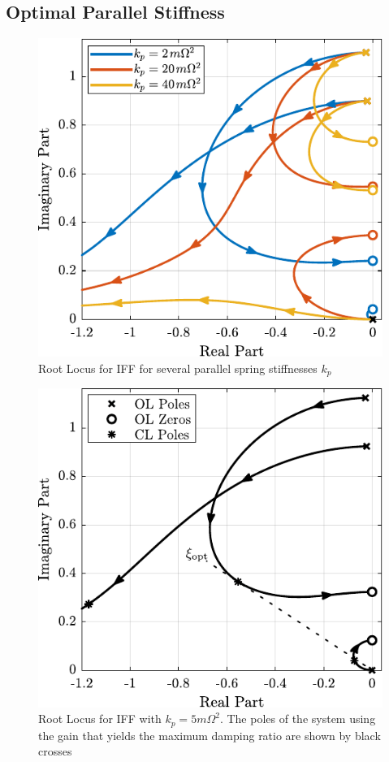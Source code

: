 \documentclass{ISMA_USD2020}
\begin{document}
\subsection{Optimal Parallel Stiffness}
\label{sec:org9c47159}

\begin{figure}[htbp]
\centering
\includegraphics[scale=1]{figs/root_locus_iff_kps.pdf}
\caption{\label{fig:root_locus_iff_kps}Root Locus for IFF for several parallel spring stiffnesses \(k_p\)}
\end{figure}


\begin{figure}[htbp]
\centering
\includegraphics[scale=1]{figs/root_locus_opt_gain_iff_kp.pdf}
\caption{\label{fig:root_locus_opt_gain_iff_kp}Root Locus for IFF with \(k_p = 5 m \Omega^2\). The poles of the system using the gain that yields the maximum damping ratio are shown by black crosses}
\end{figure}
\end{document}
